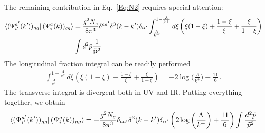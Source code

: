 \documentclass[a4paper,11pt]{article}
\def\v#1{\mathbf{#1}}
\begin{document}
The remaining contribution in Eq.~\eqref{Eq:N2} requires special attention:
\begin{align}
 \bra{ (\Psi^{a^{\prime}}_{i^{\prime}}(k^{\prime}) )_{gg} } (\Psi^{a}_{i}(k) )_{gg}\rangle &  = 
 \frac{g^2N_c}{8\pi^3} \delta^{aa^{\prime}} \delta^{3}(k-k^{\prime}) \delta_{ii^{\prime}} 
  \int_{\frac{\Lambda}{k^{+}}}^{1-\frac{\Lambda}{k^{+}}}  d\xi \left(\xi(1-\xi) + \frac{1-\xi}{\xi}  + \frac{\xi}{1-\xi} \right)\notag \\ &  
 \int d^2 \tilde p \frac{1}{\tilde{\v{p}}^2}
\end{align}
The longitudinal fraction integral can be readily performed 
\begin{align}
  \int_{\frac{\Lambda}{k^{+}}}^{1-\frac{\Lambda}{k^{+}}}  d\xi \left(\xi(1-\xi) + \frac{1-\xi}{\xi} + \frac{\xi}{1-\xi} \right) = 
   -2 \log \bigg(\frac{\Lambda}{k^{+}} \bigg)- \frac{11}{6}\,.
\end{align}
The transverse integral is divergent both in UV and IR. Putting everything together, we obtain 
\begin{align}\label{onegrhonorm}
 \bra{ (\Psi^{a^{\prime}}_{i^{\prime}}(k^{\prime}) )_{gg} } (\Psi^{a}_{i}(k) )_{gg}\rangle  = 
 - \frac{g^2N_c}{8\pi^3} \delta_{aa^{\prime}} \delta^3(k-k^{\prime}) \delta_{ii^{\prime}} 
 \left(  2 \log \bigg(\frac{\Lambda}{k^{+}} \bigg) + \frac{11}{6}  \right)
 \int \frac{d^2\tilde p}{\tilde p^2} 
\end{align}
\end{document}
